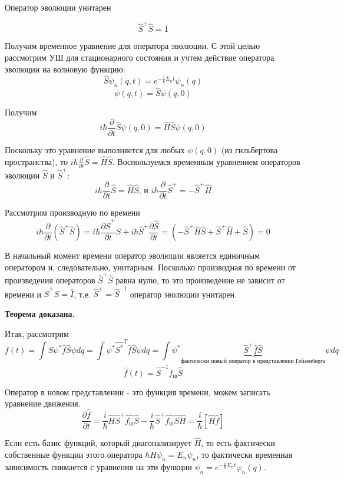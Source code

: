 \par \begin{theorem} Оператор эволюции унитарен

$$\hat{S}^+\hat{S}=1$$
\proof \par Получим временное уравнение для оператора эволюции. С этой целью рассмотрим УШ для стационарного состояния и учтем действие оператора эволюции на волновую функцию:
$$\hat{S}\psi_n(q, t)=e^{-\frac{i}{\hbar} E_n t} \psi_n (q)$$
$$\psi(q, t)=\hat{S}\psi(q, 0) $$
\par Получим
$$i\hbar \frac{\partial}{\partial t} \hat{S} \psi(q, 0)= \hat{H} \hat{S} \psi(q,0)$$
\par Поскольку это уравнение выполняется для любых $\psi(q, 0)$ (из гильбертова пространства), то $i\hbar \frac{\partial}{\partial t} \hat{S} = \hat{H} \hat{S}$. Воспользуемся временным уравнением операторов эволюции $\hat{S}$ и $\hat{S}^+$:
$$i\hbar \frac{\partial}{\partial t} \hat{S} = \hat{H} \hat{S} \text{, и } i\hbar\frac{\partial}{\partial t} \hat{S}^+ = - \hat{S}^+ \hat{H}$$
\par Рассмотрим производную по времени
$$i\hbar \frac{\partial}{\partial t}( \hat{S}^+ \hat{S})= i \hbar \frac{\partial \hat{S}^+}{\partial t} \hat{S} +  i \hbar \hat{S}^+\frac{\partial \hat{S}}{\partial t}= (-\hat{S}^+\hat{H}\hat{S}+\hat{S}^+\hat{H}+\hat{S})=0$$
\par В начальный момент времени оператор эволюции является единичным оператором и, следовательно, унитарным. Посколько производная по времени от произведения операторов $\hat{S}^+ \hat{S}$ равна нулю, то это произведение не зависит от времени и $\hat{S}^+ \hat{S}=\hat{I}$, т.е. $\hat{S}^+= \hat{S}^{-1}$ оператор эволюции унитарен.

\textbf{Теорема доказана.}
\end{theorem}
\par Итак, рассмотрим 
$$ \overline{f}(t) = \int \hat{S} \psi^* \hat{f} \hat{S}\psi dq = \int \psi^* \hat{S^*}^T \hat{f} \hat{S} \psi dq = \int \psi^* \underbrace{\hat{S}^+\hat{f}\hat{S}}_{\text{фактически новый оператор в представлении Гейзенберга}} \psi dq $$
$$ \hat{f}(t) = \hat{S}^{-1}f_ш \hat{S}$$
\par Оператор в новом представлении - это функция времени, можем записать уравнение движения.
$$\frac{\partial \hat{f}}{\partial t} =\frac{i}{\hbar}\hat{H}\hat{S}^+\hat{f_ш}\hat{S} -\frac{i}{\hbar}\hat{S}^+\hat{f_ш}\hat{S}\hat{H} = \frac{i}{\hbar}[\hat{H}\hat{f}] $$
\par Если есть базис функций, который диагонализирует $\hat{H}$, то есть фактически собственные функции этого оператора $\hbar{H}\psi_n =E_n \psi_n  $, то фактически временная зависимость снимается с уравнения на эти функции $\psi_n = e^{-\frac{i}{\hbar}E_n t}\varphi_n (q)$.
